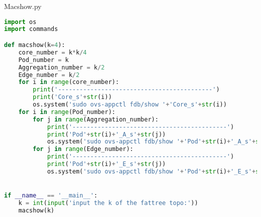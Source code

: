 \documentclass{xjtureport}
\begin{document}
\quad \quad Macshow.py
\begin{lstlisting}[language=Python]
import os
import commands

def macshow(k=4):
	core_number = k*k/4
	Pod_number = k
	Aggregation_number = k/2
	Edge_number = k/2
	for i in range(core_number): 
		print('-------------------------------------------')
		print('Core_s'+str(i))
		os.system('sudo ovs-appctl fdb/show '+'Core_s'+str(i))
	for i in range(Pod_number):
		for j in range(Aggregation_number):
			print('-------------------------------------------')
			print('Pod'+str(i)+'_A_s'+str(j))
			os.system('sudo ovs-appctl fdb/show '+'Pod'+str(i)+'_A_s'+str(j))
		for j in range(Edge_number):
			print('-------------------------------------------')
			print('Pod'+str(i)+'_E_s'+str(j))
			os.system('sudo ovs-appctl fdb/show '+'Pod'+str(i)+'_E_s'+str(j))


if __name__ == '__main__':
	k = int(input('input the k of the fattree topo:'))
	macshow(k)
\end{lstlisting}
\end{document}
